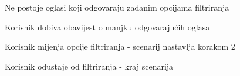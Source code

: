\begin{packed_item}
\begin{packed_item}
							\item[2.b] Ne postoje oglasi koji odgovaraju zadanim opcijama filtriranja
							\item[] \begin{packed_enum}							
								\item Korisnik dobiva obavijest o manjku odgovarajućih oglasa
								\item
									\begin{packed_enum}
										\item Korisnik mijenja opcije filtriranja - scenarij nastavlja korakom 2
										\item Korisnik odustaje od filtriranja - kraj scenarija
									\end{packed_enum}							
							\end{packed_enum}	
						\end{packed_item}
					\end{packed_item}

					\eject

